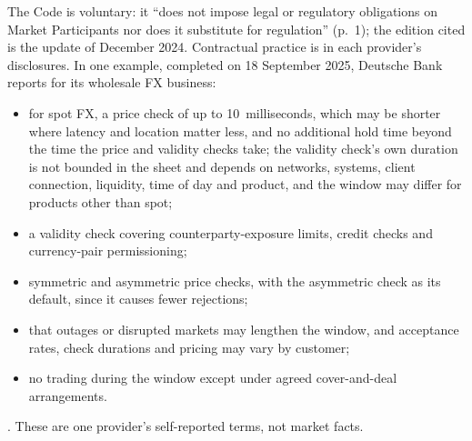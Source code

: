 \begin{qfmechanism}
 The Code is voluntary: it ``does not impose legal or regulatory obligations on Market Participants nor does it substitute for regulation'' (p.~1); the edition cited is the update of December 2024. Contractual practice is in each provider's disclosures. In one example, completed on 18 September 2025, Deutsche Bank reports for its wholesale FX business:
\begin{itemize}
\item for spot FX, a price check of up to 10~milliseconds, which may be shorter where latency and location matter less, and no additional hold time beyond the time the price and validity checks take; the validity check's own duration is not bounded in the sheet and depends on networks, systems, client connection, liquidity, time of day and product, and the window may differ for products other than spot;
\item a validity check covering counterparty-exposure limits, credit checks and currency-pair permissioning;
\item symmetric and asymmetric price checks, with the asymmetric check as its default, since it causes fewer rejections;
\item that outages or disrupted markets may lengthen the window, and acceptance rates, check durations and pricing may vary by customer;
\item no trading during the window except under agreed cover-and-deal arrangements.
\end{itemize}
\citep[sec.~C.4]{db-fxgc-lp-cover-2025}. These are one provider's self-reported terms, not market facts.


\end{qfmechanism}

